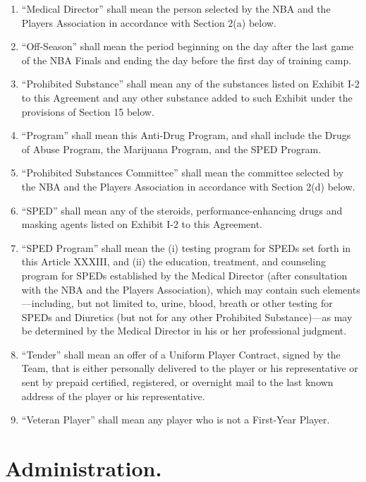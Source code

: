 \documentclass[
]{book}
\begin{document}
\begin{enumerate}
\item
  ``Medical Director'' shall mean the person selected by the NBA and the Players Association in accordance with Section 2(a) below.
\item
  ``Off-Season'' shall mean the period beginning on the day after the last game of the NBA Finals and ending the day before the first day of training camp.
\item
  ``Prohibited Substance'' shall mean any of the substances listed on Exhibit I-2 to this Agreement and any other substance added to such Exhibit under the provisions of Section 15 below.
\item
  ``Program'' shall mean this Anti-Drug Program, and shall include the Drugs of Abuse Program, the Marijuana Program, and the SPED Program.
\item
  ``Prohibited Substances Committee'' shall mean the committee selected by the NBA and the Players Association in accordance with Section 2(d) below.
\item
  ``SPED'' shall mean any of the steroids, performance-enhancing drugs and masking agents listed on Exhibit I-2 to this Agreement.
\item
  ``SPED Program'' shall mean the (i) testing program for SPEDs set forth in this Article XXXIII, and (ii) the education, treatment, and counseling program for SPEDs established by the Medical Director (after consultation with the NBA and the Players Association), which may contain such elements---including, but not limited to, urine, blood, breath or other testing for SPEDs and Diuretics (but not for any other Prohibited Substance)---as may be determined by the Medical Director in his or her professional judgment.
\item
  ``Tender'' shall mean an offer of a Uniform Player Contract, signed by the Team, that is either personally delivered to the player or his representative or sent by prepaid certified, registered, or overnight mail to the last known address of the player or his representative.
\item
  ``Veteran Player'' shall mean any player who is not a First-Year Player.
\end{enumerate}

\hypertarget{administration.}{%
\section{Administration.}\label{administration.}}
\end{document}
